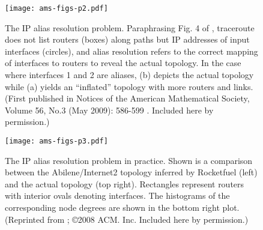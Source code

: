 \begin{figure}[!htp] 
  \begin{center}
    \texttt{[image: ams-figs-p2.pdf]}
    \caption{The IP alias resolution problem. Paraphrasing Fig. 4 of \cite{rocketfuel_1}, 
	 traceroute does not list routers (boxes) along paths but IP addresses of 
	 input interfaces (circles), and alias resolution refers to the correct 
	 mapping of interfaces to routers to reveal the actual topology. In the case
	 where interfaces 1 and 2 are aliases, (b) depicts the actual topology while 
	 (a) yields an ``inflated'' topology with more routers and links.
	 (First published in Notices of the American Mathematical Society, Volume 56, 
	 No.3 (May 2009): 586-599 \cite{willinger09:_mathem_and_inter}. Included here by permission.)
      \label{fig:hot_2}}
  \end{center}
\end{figure}         

\begin{figure}[thbp] 
  \begin{center}
    \texttt{[image: ams-figs-p3.pdf]}
    \caption{The IP alias resolution problem in practice. Shown is a comparison 
	 between the Abilene/Internet2 topology inferred by Rocketfuel (left) and the 
	 actual topology (top right). Rectangles represent routers with interior ovals 
	 denoting interfaces. The histograms of the corresponding node degrees are 
	 shown in the bottom right plot. 
	 (Reprinted from \cite{sherwood08:_discar}; \copyright 2008
         ACM. Inc. Included here by permission.)
         \label{fig:hot_3}}
  \end{center}
\end{figure}         

